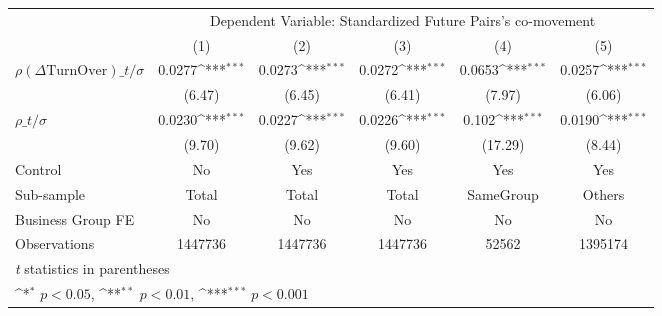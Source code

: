 {
\def\sym#1{\ifmmode^{#1}\else\(^{#1}\)\fi}
\begin{tabular}{l*{5}{c}}
\hline\hline
                &\multicolumn{5}{c}{Dependent Variable: Standardized Future Pairs's co-movement}               \\\cmidrule(lr){2-6}
                &\multicolumn{1}{c}{(1)}         &\multicolumn{1}{c}{(2)}         &\multicolumn{1}{c}{(3)}         &\multicolumn{1}{c}{(4)}         &\multicolumn{1}{c}{(5)}         \\
\hline
 $ {\rho(\Delta \text{TurnOver})\_t} / \sigma $ &   0.0277\sym{***}&   0.0273\sym{***}&   0.0272\sym{***}&   0.0653\sym{***}&   0.0257\sym{***}\\
                &   (6.47)         &   (6.45)         &   (6.41)         &   (7.97)         &   (6.06)         \\
[1em]
 $ {\rho\_t} / \sigma $ &   0.0230\sym{***}&   0.0227\sym{***}&   0.0226\sym{***}&    0.102\sym{***}&   0.0190\sym{***}\\
                &   (9.70)         &   (9.62)         &   (9.60)         &  (17.29)         &   (8.44)         \\
\hline
Control         &       No         &      Yes         &      Yes         &      Yes         &      Yes         \\
Sub-sample      &    Total         &    Total         &    Total         &SameGroup         &   Others         \\
Business Group FE&       No         &       No         &       No         &       No         &       No         \\
Observations    &  1447736         &  1447736         &  1447736         &    52562         &  1395174         \\
\hline\hline
\multicolumn{6}{l}{\footnotesize \textit{t} statistics in parentheses}\\
\multicolumn{6}{l}{\footnotesize \sym{*} \(p<0.05\), \sym{**} \(p<0.01\), \sym{***} \(p<0.001\)}\\
\end{tabular}
}
